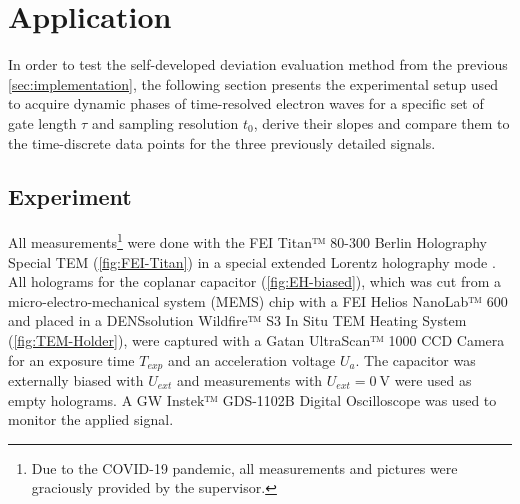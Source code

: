 \section{Application} \label{sec:application}
In order to test the self-developed deviation evaluation method from the previous \cref{sec:implementation}, the following section presents the experimental setup used to acquire dynamic phases of time-resolved electron waves for a specific set of gate length $\tau$ and sampling resolution $t_0$, derive their slopes and compare them to the time-discrete data points for the three previously detailed signals.
\subsection{Experiment} \label{ssec:application-experiment}
All measurements\footnote{Due to the COVID-19 pandemic, all measurements and pictures were graciously provided by the supervisor.} were done with the FEI Titan™ 80-300 Berlin Holography Special TEM (\cref{fig:FEI-Titan}) in a special extended Lorentz holography mode \cite{Wagner2019}. All holograms for the coplanar capacitor (\cref{fig:EH-biased}), which was cut from a micro-electro-mechanical system (MEMS) chip with a FEI Helios NanoLab™ 600 and placed in a DENSsolution Wildfire™ S3 In Situ TEM Heating System (\cref{fig:TEM-Holder}), were captured with a Gatan UltraScan™ 1000 CCD Camera for an exposure time $T_{exp}$ and an acceleration voltage $U_a$. The capacitor was externally biased with $U_{ext}$ and measurements with $U_{ext} = \SI{0}{\volt}$ were used as empty holograms. A GW Instek™ GDS-1102B Digital Oscilloscope was used to monitor the applied signal.
